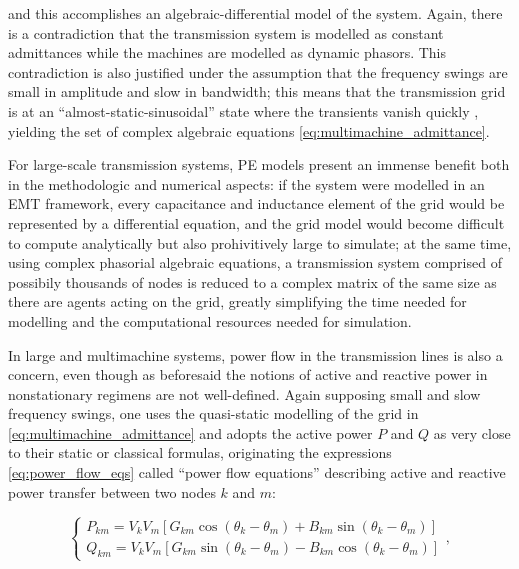 	\noindent and this accomplishes an algebraic-differential model of the system. Again, there is a contradiction that the transmission system is modelled as constant admittances while the machines are modelled as dynamic phasors. This contradiction is also justified under the assumption that the frequency swings are small in amplitude and slow in bandwidth; this means that the transmission grid is at an ``almost-static-sinusoidal'' state where the transients vanish quickly , yielding the set of complex algebraic equations \eqref{eq:multimachine_admittance}.

	For large-scale transmission systems, PE models present an immense benefit both in the methodologic and numerical aspects: if the system were modelled in an EMT framework, every capacitance and inductance element of the grid would be represented by a differential equation, and the grid model would become difficult to compute analytically but also prohivitively large to simulate; at the same time, using complex phasorial algebraic equations, a transmission system comprised of possibily thousands of nodes is reduced to a complex matrix of the same size as there are agents acting on the grid, greatly simplifying the time needed for modelling and the computational resources needed for simulation.

	In large and multimachine systems, power flow in the transmission lines is also a concern, even though as beforesaid the notions of active and reactive power in nonstationary regimens are not well-defined. Again supposing small and slow frequency swings, one uses the quasi-static modelling of the grid in \eqref{eq:multimachine_admittance} and adopts the active power $P$ and $Q$ as very close to their static or classical formulas, originating the expressions \eqref{eq:power_flow_eqs} called ``power flow equations'' describing active and reactive power transfer between two nodes $k$ and $m$:

\begin{equation} \left\{\begin{array}{l} P_{km} = V_kV_m \left[G_{km}\cos\left(\theta_k - \theta_m\right) + B_{km}\sin\left(\theta_k - \theta_m\right)\right]\\[3mm] Q_{km} = V_kV_m \left[G_{km}\sin\left(\theta_k - \theta_m\right) - B_{km}\cos\left(\theta_k - \theta_m\right)\right] \end{array}\right. \label{eq:power_flow_eqs},
\end{equation}

